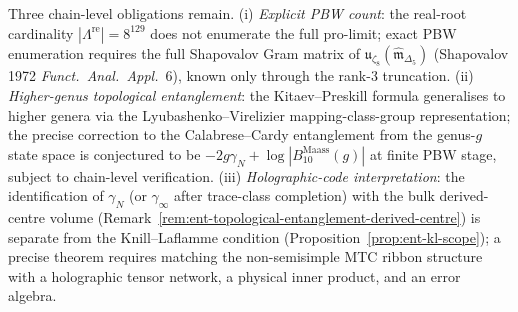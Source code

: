 \begin{remark}
\label{rem:ent-open}
Three chain-level obligations remain.
(i) \emph{Explicit PBW count}: the real-root cardinality
$|\Lambda^{\mathrm{re}}|=8^{129}$ does not enumerate the full
pro-limit; exact PBW enumeration requires the full
Shapovalov Gram matrix of
$\mathfrak u_{\zeta_8}(\widehat{\mathfrak m}_{\Delta_5})$ (Shapovalov 1972
\emph{Funct.~Anal.~Appl.}~6), known only through the rank-3 truncation.
(ii) \emph{Higher-genus topological entanglement}: the
Kitaev--Preskill formula generalises to higher genera via the
Lyubashenko--Virelizier mapping-class-group representation; the
precise correction to the Calabrese--Cardy entanglement from the
genus-$g$ state space is conjectured to be
$-2g\gamma_N + \log|B_{10}^{\mathrm{Maass}}(g)|$ at finite PBW stage,
subject to chain-level verification.
(iii) \emph{Holographic-code interpretation}: the identification of
$\gamma_N$ (or $\gamma_\infty$ after trace-class completion) with the
bulk derived-centre volume
(Remark~\ref{rem:ent-topological-entanglement-derived-centre})
is separate from the Knill--Laflamme condition
(Proposition~\ref{prop:ent-kl-scope}); a precise theorem requires
matching the non-semisimple MTC ribbon structure with a holographic
tensor network, a physical inner product, and an error algebra.
\end{remark}
